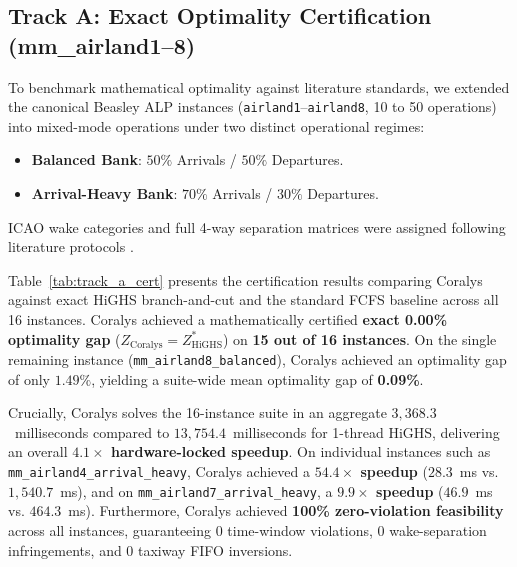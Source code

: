 \documentclass[10pt,journal,compsoc]{IEEEtran}
\begin{document}
\subsection{Track A: Exact Optimality Certification (mm\_airland1--8)}
To benchmark mathematical optimality against literature standards, we extended the canonical Beasley ALP instances (\texttt{airland1}--\texttt{airland8}, 10 to 50 operations) into mixed-mode operations under two distinct operational regimes:
\begin{itemize}
    \item \textbf{Balanced Bank}: $50\%$ Arrivals / $50\%$ Departures.
    \item \textbf{Arrival-Heavy Bank}: $70\%$ Arrivals / $30\%$ Departures.
\end{itemize}
ICAO wake categories and full 4-way separation matrices were assigned following literature protocols \cite{furini2015,faye2018}.



Table~\ref{tab:track_a_cert} presents the certification results comparing Coralys against exact HiGHS branch-and-cut and the standard FCFS baseline across all 16 instances.
Coralys achieved a mathematically certified \textbf{exact 0.00\% optimality gap} ($Z_{\text{Coralys}} = Z^*_{\text{HiGHS}}$) on \textbf{15 out of 16 instances}. On the single remaining instance (\texttt{mm\_airland8\_balanced}), Coralys achieved an optimality gap of only $1.49\%$, yielding a suite-wide mean optimality gap of \textbf{0.09\%}.

Crucially, Coralys solves the 16-instance suite in an aggregate $3,368.3$~milliseconds compared to $13,754.4$~milliseconds for 1-thread HiGHS, delivering an overall \textbf{$4.1\times$ hardware-locked speedup}. On individual instances such as \texttt{mm\_airland4\_arrival\_heavy}, Coralys achieved a \textbf{$54.4\times$ speedup} ($28.3$~ms vs. $1,540.7$~ms), and on \texttt{mm\_airland7\_arrival\_heavy}, a \textbf{$9.9\times$ speedup} ($46.9$~ms vs. $464.3$~ms). Furthermore, Coralys achieved \textbf{100\% zero-violation feasibility} across all instances, guaranteeing $0$ time-window violations, $0$ wake-separation infringements, and $0$ taxiway FIFO inversions.
\end{document}
